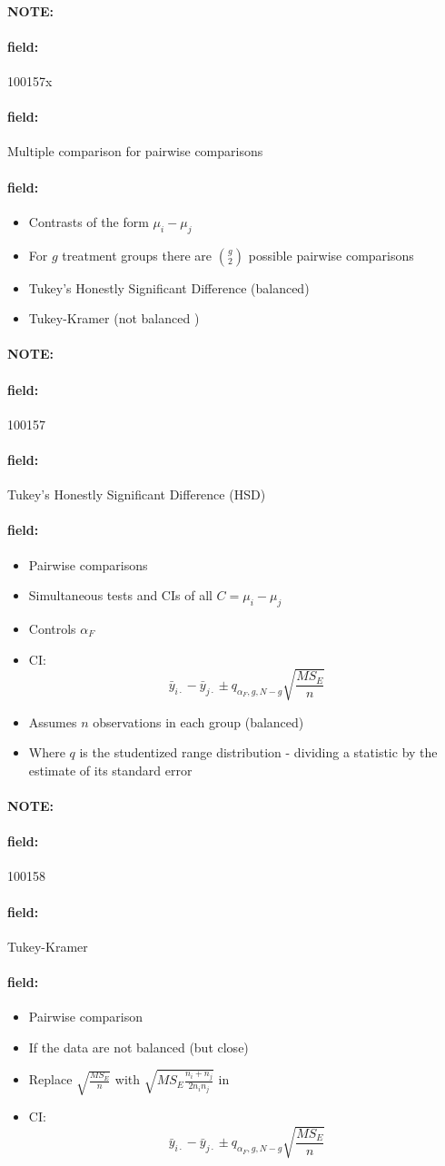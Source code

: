 \documentclass[12pt]{article}
\newenvironment{note}{\paragraph{NOTE:}}{}
\newenvironment{field}{\paragraph{field:}}{}
\begin{document}
\begin{note}
 \begin{field}
  \tiny 100157x
 \end{field}
 \begin{field}
  Multiple comparison for pairwise comparisons
 \end{field}
 \begin{field}
  \begin{itemize}
   \item Contrasts of the form $\mu_i - \mu_j$
   \item For $g$ treatment groups there are $\binom{g}{2}$ possible pairwise comparisons
   \item Tukey's Honestly Significant Difference (balanced)
   \item Tukey-Kramer (not balanced )
  \end{itemize}
 \end{field}
\end{note}

\begin{note}
 \begin{field}
  \tiny 100157
 \end{field}
 \begin{field}
  Tukey's Honestly Significant Difference (HSD)
 \end{field}
 \begin{field}
  \begin{itemize}
   \item Pairwise comparisons
   \item Simultaneous tests and CIs of all $C = \mu_i - \mu_j$
   \item Controls $\alpha_F$
   \item CI: $$\bar{y}_{i\cdot} - \bar{y}_{j\cdot} \pm q_{\alpha_F, g, N-g}\sqrt{\frac{MS_E}{n}} $$
   \item Assumes $n$ observations in each group (balanced)
   \item Where $q$ is the studentized range distribution - dividing a statistic by the estimate of its standard error
  \end{itemize}
 \end{field}
\end{note}


\begin{note}
 \begin{field}
  \tiny 100158
 \end{field}
 \begin{field}
  Tukey-Kramer
 \end{field}
 \begin{field}
  \begin{itemize}
   \item Pairwise comparison
   \item If the data are not balanced (but close)
   \item Replace $\sqrt{\frac{MS_E}{n}}$ with $\sqrt{MS_E \frac{n_i + n_j}{2n_in_j}}$ in
   \item  CI: $$\bar{y}_{i\cdot} - \bar{y}_{j\cdot} \pm q_{\alpha_F, g, N-g}\sqrt{\frac{MS_E}{n}} $$
  \end{itemize}
 \end{field}
\end{note}
\end{document}
